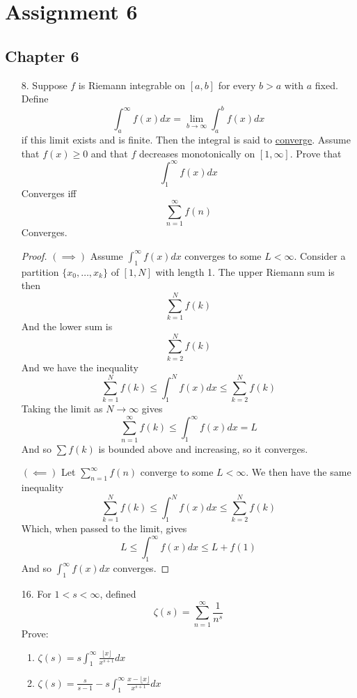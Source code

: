 \documentclass[hidelinks,12pt]{article}
\title{\scalebox{1.5}{Math 723 Homework 6}}
\author{\scalebox{1.5}{Theo Koss}}
\date{December 2024}
\renewcommand{\geq}{\geqslant}
\renewcommand{\leq}{\leqslant}
\begin{document}
\maketitle
\section*{Assignment 6}
\subsection*{Chapter 6}
\begin{enumerate}
    \item[8.] Suppose \(f\) is Riemann integrable on \([a,b]\) for every \(b>a\) with \(a\) fixed. Define \[
    \int_{a}^{\infty}f(x)dx=\lim_{b\to\infty}\int_{a}^{b}f(x)dx
    \]
    if this limit exists and is finite. Then the integral is said to \underline{converge}. Assume that \(f(x)\geq0\) and that \(f\) decreases monotonically on \([1,\infty]\). Prove that \[
    \int_{1}^{\infty}f(x)dx
    \]
   Converges iff \[
   \sum_{n=1}^{\infty}f(n)
   \]
   Converges. 
   \begin{proof}
       \((\implies)\) Assume \(\int_{1}^{\infty}f(x)dx\) converges to some \(L<\infty\). Consider a partition \(\{x_{0},\dots,x_{k}\}\) of \([1,N]\) with length 1. The upper Riemann sum is then \[
   \sum_{k=1}^{N}f(k)
   \]
  And the lower sum is \[
  \sum_{k=2}^{N}f(k)
  \]
  And we have the inequality \[
  \sum_{k=1}^{N}f(k)\leq\int_{1}^{N}f(x)dx\leq\sum_{k=2}^{N}f(k)
  \]
Taking the limit as \(N\to\infty\) gives \[
\sum_{n=1}^{\infty}f(k)\leq\int_{1}^{\infty}f(x)dx=L
\]
And so \(\sum f(k)\) is bounded above and increasing, so it converges.
 \par\null\par \((\impliedby)\) Let \(\sum_{n=1}^{\infty}f(n)\) converge to some \(L<\infty\). We then have the same inequality
\[
  \sum_{k=1}^{N}f(k)\leq\int_{1}^{N}f(x)dx\leq\sum_{k=2}^{N}f(k)
\]
Which, when passed to the limit, gives \[
L\leq \int_{1}^{\infty}f(x)dx\leq L+f(1)
\]
And so \(\int_{1}^{\infty}f(x)dx\) converges. 
   \end{proof}
    \item[16.] For \(1<s<\infty\), defined \[
    \zeta(s)=\sum_{n=1}^{\infty}\frac{1}{n^{s}}
    \]
   Prove: \begin{enumerate}[label=(\alph*).]
       \item \(\zeta(s)=s\int_{1}^{\infty}\frac{\lfloor x\rfloor}{x^{s+1}}dx\)
       \item \(\zeta(s)=\frac{s}{s-1}-s\int_{1}^{\infty}\frac{x-\lfloor x\rfloor}{x^{s+1}}dx\)

\end{enumerate}
\end{enumerate}
\end{document}
